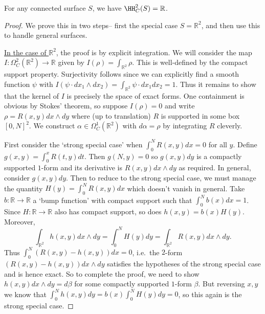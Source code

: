 \begin{theorem}
    For any connected surface \(S\), we have \(\HH^2_C(S)=\mathbb{R}\).
    \begin{proof}
        We prove this in two steps-- first the special case \(S=\mathbb{R}^2\),
        and then use this to handle general surfaces.

        \underline{In the case of \(\mathbb{R}^2\)}, the proof is by explicit
        integration.  We will consider the map \(I:\Omega^2_C(\mathbb{R}^2)\to
        \mathbb{R}\) given by \(I(\rho)=\int_{\mathbb{R}^2} \rho\). This is
        well-defined by the compact support property. Surjectivity follows since
        we can explicitly find a smooth function \(\psi\) with \(I(\psi\cdot
        dx_1\wedge dx_2)=\int_{\mathbb{R}^2}\psi \cdot dx_1dx_2=1\).
        Thus it remains to show that the kernel of \(I\) is
        precisely the space of exact forms. One containment is obvious by
        Stokes' theorem, so suppose \(I(\rho)=0\) and write
        \(\rho=R(x,y)dx\wedge dy\) where (up to translation) \(R\) is supported
        in some box \([0,N]^2\). We construct \(\alpha\in
        \Omega^1_C(\mathbb{R}^2)\) with \(d\alpha=\rho\) by integrating \(R\)
        cleverly.

        First consider the `strong special case' when \(\int_{0}^N R(x,y)dx
        =0\) for all \(y\). Define \(g(x,y)=\int_{0}^x R(t,y)dt\). Then
        \(g(N,y)=0\) so \(g(x,y)dy\) is a compactly supported \(1\)-form and its
        derivative is \(R(x,y)dx\wedge dy\)  as required. In general, consider
        \(g(x,y)dy\). Then to reduce to the strong special case, we must manage
        the quantity \(H(y)=\int_0^N R(x,y)dx\) which doesn't vanish in general. Take
        \(b:\mathbb{R}\to \mathbb{R}\) a `bump function' with compact
        support such that \(\int_{0}^Nb(x)dx=1\). Since \(H:\mathbb{R}\to
        \mathbb{R}\) also has compact support, so does \(h(x,y)=b(x)H(y)\). Moreover,
        \[\int_{\mathbb{R}^2} h(x,y)dx\wedge dy = \int_{0}^N H(y)dy =
        \int_{\mathbb{R}^2}R(x,y)dx\wedge dy.\] Thus  \(\int_{0}^N
        (R(x,y)-h(x,y))dx=0\), i.e.\ the \(2\)-form
        \((R(x,y)-h(x,y))dx\wedge dy\) satisfies the hypotheses of the strong
        special case and is hence exact. So to complete the proof, we need to show \(h(x,y)dx\wedge dy =d\beta\) for some compactly supported
        \(1\)-form \(\beta\). But reversing \(x,y\) we know that
        \(\int_{0}^Nh(x,y)dy = b(x)\int_{0}^N H(y)dy = 0\), so this again
        is the strong special case.


\end{proof}
\end{theorem}

